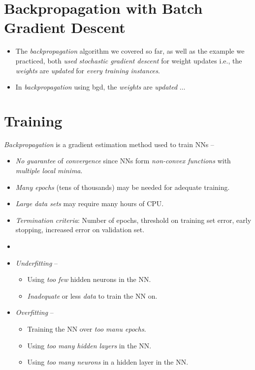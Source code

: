 \documentclass[
	number={8},
	title={Artificial Neural Network}
]{cs584notes}
\begin{document}
\section{Backpropagation with Batch Gradient Descent}\label{sec:backpropagation-with-batch-gradient-descent}
\begin{itemize}
	\item The \emph{backpropagation} algorithm we covered so far, as well as the example we practiced, both \emph{used stochastic gradient descent} for weight updates i.e., the \emph{weights} are \emph{updated} for \emph{every training instances}.
	\item In \emph{backpropagation} using bgd, the \emph{weights} are \emph{updated} $\dots$
\end{itemize}

\section{Training}\label{sec:training}
\emph{Backpropagation} is a gradient estimation method used to train NNs --
\begin{itemize}
	\item \emph{No guarantee} of \emph{convergence} since NNs form \emph{non-convex functions} with \emph{multiple local minima}.
	\item \emph{Many epochs} (tens of thousands) may be needed for adequate training.
	\item \emph{Large data sets} may require many hours of CPU\@.
	\item \emph{Termination criteria}: Number of epochs, threshold on training set error, early stopping, increased error on validation set.
	\item
	\item \emph{Underfitting} --
	\begin{itemize}
		\item Using \emph{too few} hidden neurons in the NN\@.
		\item \emph{Inadequate} or less \emph{data} to train the NN on.
	\end{itemize}
	\item \emph{Overfitting} --
	\begin{itemize}
		\item Training the NN over \emph{too manu epochs}.
		\item Using \emph{too many hidden layers} in the NN\@.
		\item Using \emph{too many neurons} in a hidden layer in the NN\@.
	\end{itemize}
\end{itemize}
\end{document}
